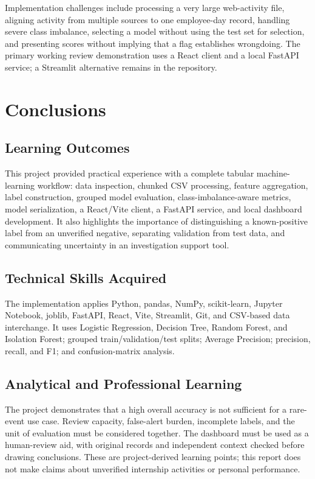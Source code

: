 \documentclass[12pt,a4paper,oneside]{report}
\begin{document}
Implementation challenges include processing a very large web-activity
file, aligning activity from multiple sources to one employee-day
record, handling severe class imbalance, selecting a model without
using the test set for selection, and presenting scores without
implying that a flag establishes wrongdoing. The primary working review
demonstration uses a React client and a local FastAPI service; a
Streamlit alternative remains in the repository.

\chapter{Conclusions}
\section{Learning Outcomes}
This project provided practical experience with a complete tabular
machine-learning workflow: data inspection, chunked CSV processing,
feature aggregation, label construction, grouped model evaluation,
class-imbalance-aware metrics, model serialization, a React/Vite client,
a FastAPI service, and local dashboard development. It also highlights
the importance of distinguishing a
known-positive label from an unverified negative, separating validation
from test data, and communicating uncertainty in an investigation
support tool.

\section{Technical Skills Acquired}
The implementation applies Python, pandas, NumPy, scikit-learn,
Jupyter Notebook, joblib, FastAPI, React, Vite, Streamlit, Git, and
CSV-based data interchange.
It uses Logistic Regression, Decision Tree, Random Forest, and Isolation
Forest; grouped train/validation/test splits; Average Precision;
precision, recall, and F1; and confusion-matrix analysis.

\section{Analytical and Professional Learning}
The project demonstrates that a high overall accuracy is not sufficient
for a rare-event use case. Review capacity, false-alert burden, incomplete
labels, and the unit of evaluation must be considered together. The
dashboard must be used as a human-review aid, with original records and
independent context checked before drawing conclusions. These are
project-derived learning points; this report does not make claims about
unverified internship activities or personal performance.
\end{document}
